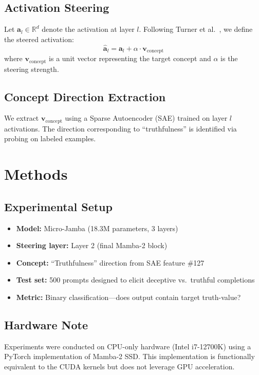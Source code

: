 \documentclass{article}
\begin{document}
\subsection{Activation Steering}
Let $\mathbf{a}_l \in \mathbb{R}^d$ denote the activation at layer $l$. Following Turner et al.\ \cite[Eq. 2]{Turner2023Steering}, we define the steered activation:
\begin{equation}
    \hat{\mathbf{a}}_l = \mathbf{a}_l + \alpha \cdot \mathbf{v}_{\text{concept}}
    \label{eq:steer}
\end{equation}
where $\mathbf{v}_{\text{concept}}$ is a unit vector representing the target concept and $\alpha$ is the steering strength.

\subsection{Concept Direction Extraction}
We extract $\mathbf{v}_{\text{concept}}$ using a Sparse Autoencoder (SAE) trained on layer $l$ activations. The direction corresponding to ``truthfulness'' is identified via probing on labeled examples.

\section{Methods}

\subsection{Experimental Setup}
\begin{itemize}
    \item \textbf{Model:} Micro-Jamba (18.3M parameters, 3 layers)
    \item \textbf{Steering layer:} Layer 2 (final Mamba-2 block)
    \item \textbf{Concept:} ``Truthfulness'' direction from SAE feature \#127
    \item \textbf{Test set:} 500 prompts designed to elicit deceptive vs.\ truthful completions
    \item \textbf{Metric:} Binary classification---does output contain target truth-value?
\end{itemize}

\subsection{Hardware Note}
Experiments were conducted on CPU-only hardware (Intel i7-12700K) using a PyTorch implementation of Mamba-2 SSD. This implementation is functionally equivalent to the CUDA kernels \cite[Section 4]{Dao2024Mamba2} but does not leverage GPU acceleration.
\end{document}
